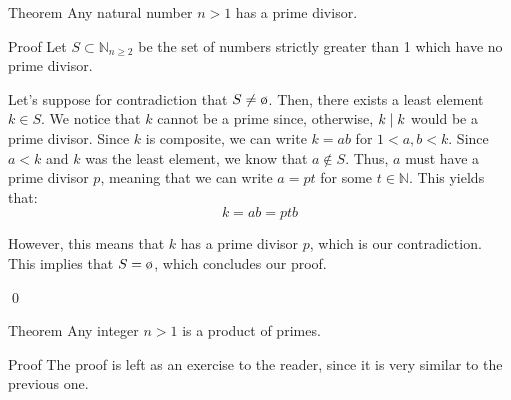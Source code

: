 \documentclass[a4paper]{article}
\begin{document}
\begin{parag}{Theorem}
    Any natural number $n > 1$ has a prime divisor.

    \begin{subparag}{Proof}
        Let $S \subset \mathbb{N}_{n \geq 2}$ be the set of numbers strictly greater than 1 which have no prime divisor. 

        Let's suppose for contradiction that $S \neq \o$. Then, there exists a least element $k \in S$. We notice that $k$ cannot be a prime since, otherwise, $k \mid k$ would be a prime divisor. Since $k$ is composite, we can write $k = ab$ for $1 < a, b < k$. Since $a < k$ and $k$ was the least element, we know that $a \not \in S$. Thus, $a$ must have a prime divisor $p$, meaning that we can write $a = pt$ for some $t \in \mathbb{N}$. This yields that: 
        \[k = ab = ptb\]
        
        However, this means that $k$ has a prime divisor $p$, which is our contradiction. This implies that $S = \o$, which concludes our proof.

        \qed
    \end{subparag}
\end{parag}

\begin{parag}{Theorem}
    Any integer $n > 1$ is a product of primes.

    \begin{subparag}{Proof}
        The proof is left as an exercise to the reader, since it is very similar to the previous one.
    \end{subparag}
\end{parag}
\end{document}
